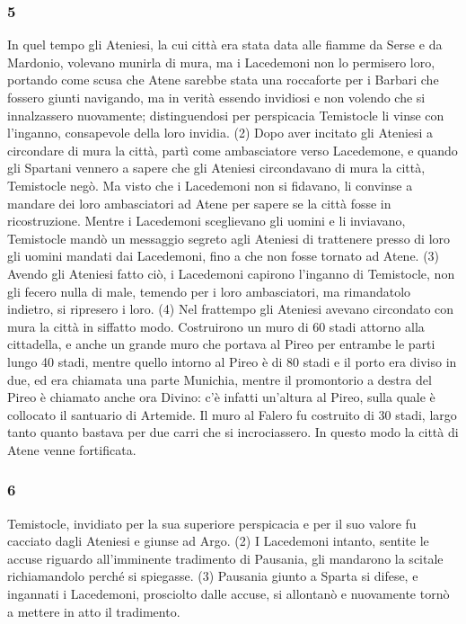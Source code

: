 \subsubsection*{5} In quel tempo gli Ateniesi, la cui città era stata data alle fiamme da Serse e da Mardonio, volevano munirla di mura, ma i Lacedemoni non lo permisero loro, portando come scusa che Atene sarebbe stata una roccaforte per i Barbari che fossero giunti navigando, ma in verità essendo invidiosi e non volendo che si innalzassero nuovamente; distinguendosi per perspicacia Temistocle li vinse con l'inganno, consapevole della loro invidia.  (2) Dopo aver incitato gli Ateniesi a circondare di mura la città, partì come ambasciatore verso Lacedemone, e quando gli Spartani vennero a sapere che gli Ateniesi circondavano di mura la città, Temistocle negò. Ma visto che i Lacedemoni non si fidavano, li convinse a mandare dei loro ambasciatori ad Atene per sapere se la città fosse in ricostruzione. Mentre i Lacedemoni sceglievano gli uomini e li inviavano, Temistocle mandò un messaggio segreto agli Ateniesi di trattenere presso di loro gli uomini mandati dai Lacedemoni, fino a che non fosse tornato ad Atene. (3) Avendo gli Ateniesi fatto ciò, i Lacedemoni capirono l'inganno di Temistocle, non gli fecero nulla di male, temendo per i loro ambasciatori, ma rimandatolo indietro, si ripresero i loro. (4) Nel frattempo gli Ateniesi avevano circondato con mura la città in siffatto modo. Costruirono un muro di 60 stadi attorno alla cittadella,  e anche un grande muro che portava al Pireo per entrambe le parti lungo 40 stadi, mentre quello intorno al Pireo è di 80 stadi e il porto era diviso in due, ed era chiamata una parte Munichia, mentre il promontorio a destra del Pireo è chiamato anche ora Divino: c'è infatti un'altura al Pireo, sulla quale è collocato il santuario di Artemide. Il muro al Falero fu costruito di 30 stadi, largo tanto quanto bastava per due carri che si incrociassero. In questo modo la città di Atene venne fortificata. 

\subsubsection*{6} Temistocle, invidiato per la sua superiore perspicacia e per il suo valore fu cacciato dagli Ateniesi e giunse ad Argo. (2) I Lacedemoni intanto, sentite le accuse riguardo all'imminente tradimento di Pausania, gli mandarono la scitale richiamandolo perché si spiegasse. (3) Pausania giunto a Sparta si difese, e ingannati i Lacedemoni, prosciolto dalle accuse, si allontanò e nuovamente tornò a mettere in atto il tradimento.

